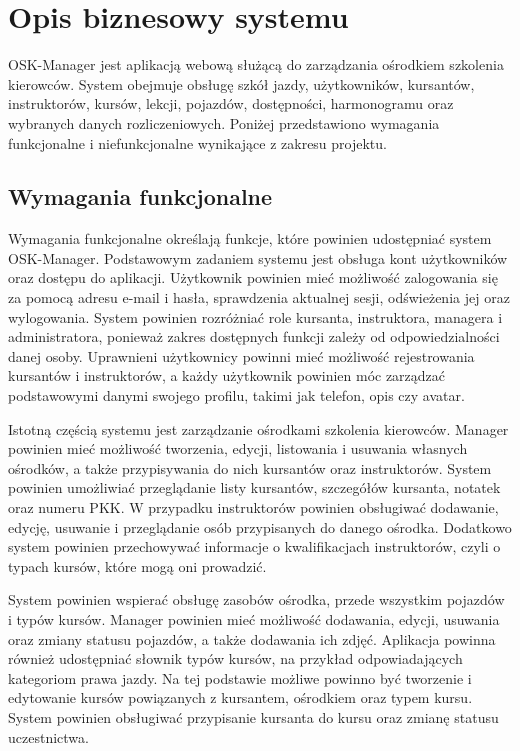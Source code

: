 \chapter{Opis biznesowy systemu}
\label{cha:opisBiznesowy}

OSK-Manager jest aplikacją webową służącą do zarządzania ośrodkiem szkolenia kierowców. System obejmuje obsługę szkół jazdy, użytkowników, kursantów, instruktorów, kursów, lekcji, pojazdów, dostępności, harmonogramu oraz wybranych danych rozliczeniowych. Poniżej przedstawiono wymagania funkcjonalne i niefunkcjonalne wynikające z zakresu projektu.

\section{Wymagania funkcjonalne}
\label{sec:wymaganiaFunkcjonalne}

Wymagania funkcjonalne określają funkcje, które powinien udostępniać system OSK-Manager. Podstawowym zadaniem systemu jest obsługa kont użytkowników oraz dostępu do aplikacji. Użytkownik powinien mieć możliwość zalogowania się za pomocą adresu e-mail i hasła, sprawdzenia aktualnej sesji, odświeżenia jej oraz wylogowania. System powinien rozróżniać role kursanta, instruktora, managera i administratora, ponieważ zakres dostępnych funkcji zależy od odpowiedzialności danej osoby. Uprawnieni użytkownicy powinni mieć możliwość rejestrowania kursantów i instruktorów, a każdy użytkownik powinien móc zarządzać podstawowymi danymi swojego profilu, takimi jak telefon, opis czy avatar.

Istotną częścią systemu jest zarządzanie ośrodkami szkolenia kierowców. Manager powinien mieć możliwość tworzenia, edycji, listowania i usuwania własnych ośrodków, a także przypisywania do nich kursantów oraz instruktorów. System powinien umożliwiać przeglądanie listy kursantów, szczegółów kursanta, notatek oraz numeru PKK. W przypadku instruktorów powinien obsługiwać dodawanie, edycję, usuwanie i przeglądanie osób przypisanych do danego ośrodka. Dodatkowo system powinien przechowywać informacje o kwalifikacjach instruktorów, czyli o typach kursów, które mogą oni prowadzić.

System powinien wspierać obsługę zasobów ośrodka, przede wszystkim pojazdów i typów kursów. Manager powinien mieć możliwość dodawania, edycji, usuwania oraz zmiany statusu pojazdów, a także dodawania ich zdjęć. Aplikacja powinna również udostępniać słownik typów kursów, na przykład odpowiadających kategoriom prawa jazdy. Na tej podstawie możliwe powinno być tworzenie i edytowanie kursów powiązanych z kursantem, ośrodkiem oraz typem kursu. System powinien obsługiwać przypisanie kursanta do kursu oraz zmianę statusu uczestnictwa.

